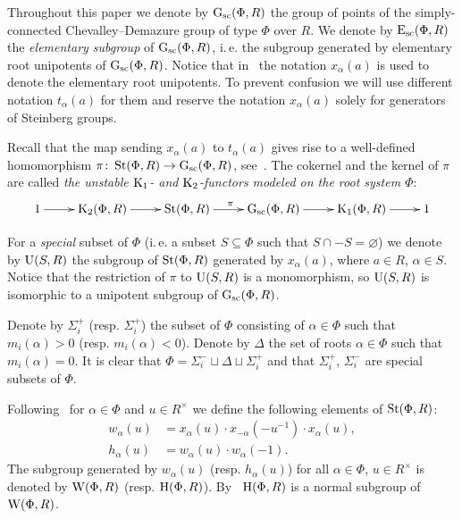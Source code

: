 Throughout this paper we denote by $\operatorname{G}_\mathrm{sc}(\Phi, R)$ the group of points of the simply-connected Chevalley--Demazure group of type $\Phi$ over $R$.
We denote by $\operatorname{E}_\mathrm{sc}(\Phi, R)$ the \textit{elementary subgroup} of $\operatorname{G}_\mathrm{sc}(\Phi, R)$, i.\,e. the subgroup generated by elementary root unipotents of $\operatorname{G}_\mathrm{sc}(\Phi, R)$.
Notice that in~\cite{VP, Vav09} the notation $x_\alpha(a)$ is used to denote the elementary root unipotents.
To prevent confusion we will use different notation $t_\alpha(a)$ for them and reserve the notation $x_\alpha(a)$ solely for generators of Steinberg groups.

Recall that the map sending $x_\alpha(a)$ to $t_\alpha(a)$ gives rise to a well-defined homomorphism $\pi \colon \operatorname{St}(\Phi, R) \to \operatorname{G}_\mathrm{sc}(\Phi, R)$, see~\cite[\S~1A]{St78}.
The cokernel and the kernel of $\pi$ are called \textit{the unstable $\operatorname{K}_1$- and $\operatorname{K}_2$-functors modeled on the root system $\Phi$}:
\begin{equation} \label{eq:K1-K2-sequence}
  \xymatrix{ 1 \ar[r] & \K_2(\Phi, R) \ar[r] & \St(\Phi, R) \ar[r]^{\pi} & \Gsc(\Phi, R) \ar[r] & \K_1(\Phi, R) \ar[r] & 1}
\end{equation}

For a \textit{special} subset of $\Phi$ (i.\,e. a subset $S \subseteq \Phi$ such that $S \cap -S = \varnothing$)
we denote by $\operatorname{U}(S, R)$ the subgroup of $\operatorname{St}(\Phi, R)$ generated by $x_\alpha(a)$, where $a \in R$, $\alpha \in S$.
Notice that the restriction of $\pi$ to $\operatorname{U}(S, R)$ is a monomorphism, so $\operatorname{U}(S, R)$ is isomorphic to a unipotent subgroup of $\operatorname{G}_\mathrm{sc}(\Phi, R)$.

Denote by $\Sigma^+_i$ (resp. $\Sigma^+_i$) the subset of $\Phi$ consisting of $\alpha \in \Phi$ such that $m_i(\alpha) > 0$ (resp. $m_i(\alpha) < 0$).
Denote by $\Delta$ the set of roots $\alpha \in \Phi$ such that $m_i(\alpha) = 0$.
It is clear that $\Phi = \Sigma_i^- \sqcup \Delta \sqcup \Sigma_i^+$ and that $\Sigma_i^+$, $\Sigma_i^-$ are special subsets of $\Phi$.

Following~\cite{Ma69} for $\alpha\in\Phi$ and $u \in R^\times$ we define the following elements of $\operatorname{St}(\Phi, R)$:
\begin{align} w_\alpha(u) & =  x_\alpha(u) \cdot x_{-\alpha}(-u^{-1}) \cdot x_\alpha(u), \label{eq:w-definition} \\
               h_\alpha(u) & =  w_\alpha(u) \cdot w_\alpha(-1).  \label{eq:h-definition} \end{align}
The subgroup generated by $w_\alpha(u)$ (resp. $h_\alpha(u)$) for all $\alpha\in \Phi$, $u \in R^\times$ is denoted by $\operatorname{W}(\Phi, R)$ (resp. $\operatorname{H}(\Phi, R)$).
By~\cite[Lemme~5.2]{Ma69} $\operatorname{H}(\Phi, R)$ is a normal subgroup of $\operatorname{W}(\Phi, R)$.

